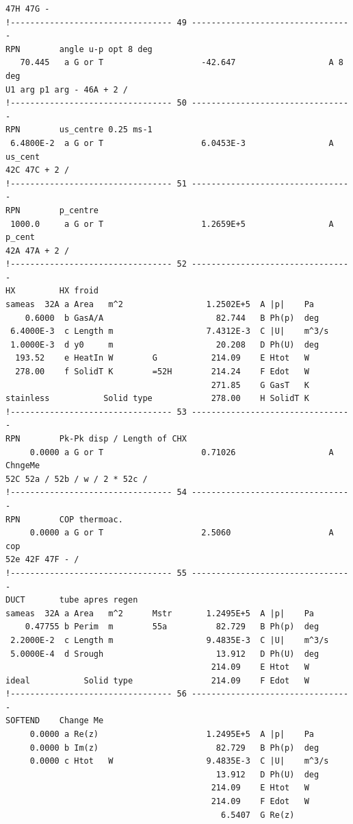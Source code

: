 \begin{linenumbers}
\begin{verbatim}
47H 47G -
!--------------------------------- 49 ---------------------------------
RPN        angle u-p opt 8 deg
   70.445   a G or T                    -42.647                   A 8 deg
U1 arg p1 arg - 46A + 2 /
!--------------------------------- 50 ---------------------------------
RPN        us_centre 0.25 ms-1
 6.4800E-2  a G or T                    6.0453E-3                 A us_cent
42C 47C + 2 /
!--------------------------------- 51 ---------------------------------
RPN        p_centre
 1000.0     a G or T                    1.2659E+5                 A p_cent
42A 47A + 2 /
!--------------------------------- 52 ---------------------------------
HX         HX froid
sameas  32A a Area   m^2                 1.2502E+5  A |p|    Pa
    0.6000  b GasA/A                       82.744   B Ph(p)  deg
 6.4000E-3  c Length m                   7.4312E-3  C |U|    m^3/s
 1.0000E-3  d y0     m                     20.208   D Ph(U)  deg
  193.52    e HeatIn W        G           214.09    E Htot   W
  278.00    f SolidT K        =52H        214.24    F Edot   W
                                          271.85    G GasT   K
stainless           Solid type            278.00    H SolidT K
!--------------------------------- 53 ---------------------------------
RPN        Pk-Pk disp / Length of CHX
     0.0000 a G or T                    0.71026                   A ChngeMe
52C 52a / 52b / w / 2 * 52c /
!--------------------------------- 54 ---------------------------------
RPN        COP thermoac.
     0.0000 a G or T                    2.5060                    A cop
52e 42F 47F - /
!--------------------------------- 55 ---------------------------------
DUCT       tube apres regen
sameas  32A a Area   m^2      Mstr       1.2495E+5  A |p|    Pa
    0.47755 b Perim  m        55a          82.729   B Ph(p)  deg
 2.2000E-2  c Length m                   9.4835E-3  C |U|    m^3/s
 5.0000E-4  d Srough                       13.912   D Ph(U)  deg
                                          214.09    E Htot   W
ideal           Solid type                214.09    F Edot   W
!--------------------------------- 56 ---------------------------------
SOFTEND    Change Me
     0.0000 a Re(z)                      1.2495E+5  A |p|    Pa
     0.0000 b Im(z)                        82.729   B Ph(p)  deg
     0.0000 c Htot   W                   9.4835E-3  C |U|    m^3/s
                                           13.912   D Ph(U)  deg
                                          214.09    E Htot   W
                                          214.09    F Edot   W
                                            6.5407  G Re(z)

\end{verbatim}
\end{linenumbers}
